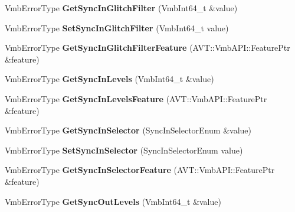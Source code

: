 \begin{DoxyCompactItemize}
\item 
\hypertarget{classMakoCamera_a8befd767c5a20dd3efe7e1f5852a3745}{Vmb\-Error\-Type {\bfseries Get\-Sync\-In\-Glitch\-Filter} (Vmb\-Int64\-\_\-t \&value)}\label{classMakoCamera_a8befd767c5a20dd3efe7e1f5852a3745}

\item 
\hypertarget{classMakoCamera_aae451219aa704ab0443fb075fe166c79}{Vmb\-Error\-Type {\bfseries Set\-Sync\-In\-Glitch\-Filter} (Vmb\-Int64\-\_\-t value)}\label{classMakoCamera_aae451219aa704ab0443fb075fe166c79}

\item 
\hypertarget{classMakoCamera_aef6dc1592b540542fce44947d1b494f0}{Vmb\-Error\-Type {\bfseries Get\-Sync\-In\-Glitch\-Filter\-Feature} (A\-V\-T\-::\-Vmb\-A\-P\-I\-::\-Feature\-Ptr \&feature)}\label{classMakoCamera_aef6dc1592b540542fce44947d1b494f0}

\item 
\hypertarget{classMakoCamera_ab2509f617f402e3a856bf2e6beb9c653}{Vmb\-Error\-Type {\bfseries Get\-Sync\-In\-Levels} (Vmb\-Int64\-\_\-t \&value)}\label{classMakoCamera_ab2509f617f402e3a856bf2e6beb9c653}

\item 
\hypertarget{classMakoCamera_ae8d2d7474478b7cd30eb9c0d59f4e720}{Vmb\-Error\-Type {\bfseries Get\-Sync\-In\-Levels\-Feature} (A\-V\-T\-::\-Vmb\-A\-P\-I\-::\-Feature\-Ptr \&feature)}\label{classMakoCamera_ae8d2d7474478b7cd30eb9c0d59f4e720}

\item 
\hypertarget{classMakoCamera_a73a00154c11f21f0f93e602daf214c8d}{Vmb\-Error\-Type {\bfseries Get\-Sync\-In\-Selector} (Sync\-In\-Selector\-Enum \&value)}\label{classMakoCamera_a73a00154c11f21f0f93e602daf214c8d}

\item 
\hypertarget{classMakoCamera_ae3e162bec10377ca79c6940b9e540893}{Vmb\-Error\-Type {\bfseries Set\-Sync\-In\-Selector} (Sync\-In\-Selector\-Enum value)}\label{classMakoCamera_ae3e162bec10377ca79c6940b9e540893}

\item 
\hypertarget{classMakoCamera_a5ae81f24b271389559d84c39613f082a}{Vmb\-Error\-Type {\bfseries Get\-Sync\-In\-Selector\-Feature} (A\-V\-T\-::\-Vmb\-A\-P\-I\-::\-Feature\-Ptr \&feature)}\label{classMakoCamera_a5ae81f24b271389559d84c39613f082a}

\item 
\hypertarget{classMakoCamera_aeb308e8b5ddbb278f044f1857af7897d}{Vmb\-Error\-Type {\bfseries Get\-Sync\-Out\-Levels} (Vmb\-Int64\-\_\-t \&value)}\label{classMakoCamera_aeb308e8b5ddbb278f044f1857af7897d}


\end{DoxyCompactItemize}
